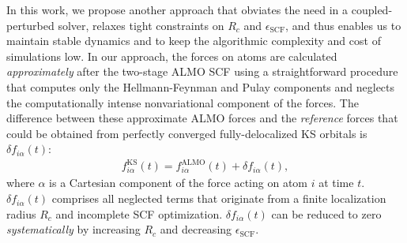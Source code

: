 \documentclass[aps,prl,reprint,amsmath,amssymb]{revtex4-1}
\begin{document}
In this work, we propose another approach that obviates the need in a coupled-perturbed solver, relaxes tight constraints on $R_{c}$ and $\epsilon_{\text{SCF}}$, and thus enables us to maintain stable dynamics and to keep the algorithmic complexity and cost of simulations low. 
%
In our approach, the forces on atoms are calculated \emph{approximately} after the two-stage ALMO SCF using a straightforward procedure that computes only the Hellmann-Feynman and Pulay components and neglects the computationally intense nonvariational component of the forces. 
The difference between these approximate ALMO forces and the \emph{reference} forces that could be obtained from perfectly converged fully-delocalized KS orbitals is $\delta f_{i\alpha}(t)$:
%
\begin{align}
\label{eq:deltaf}
f^{\text{KS}}_{i\alpha}(t) = f^{\text{ALMO}}_{i\alpha}(t) + \delta f_{i\alpha} (t),
\end{align}
%
where $\alpha$ is a Cartesian component of the force acting on atom $i$ at time $t$. $\delta f_{i\alpha} (t)$ comprises all neglected terms that originate from a finite localization radius $R_c$ and incomplete SCF optimization. 
$\delta f_{i\alpha} (t)$ can be reduced to zero \emph{systematically} by increasing $R_c$ and decreasing $\epsilon_{\text{SCF}}$.
\end{document}
